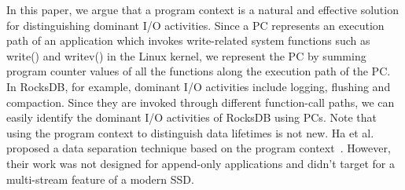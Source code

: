 In this paper, 
we argue that a program context is a natural and effective solution 
for distinguishing dominant I/O activities.  
Since a PC represents an execution path of an application which invokes 
write-related system functions such as write() and writev() in the Linux kernel,  
we represent the PC by summing program counter values of all the functions 
along the execution path of the PC.   
In RocksDB, for example, dominant I/O activities include logging, 
flushing and compaction.  
Since they are invoked through different function-call paths, 
we can easily identify the dominant I/O activities of RocksDB using PCs. 
Note that using the program context to distinguish data lifetimes is not new.  
Ha et al. proposed a data separation technique based on the program context~\cite{PCHa}.   
However, their work was not designed for append-only applications and didn’t target 
for a multi-stream feature of a modern SSD.

